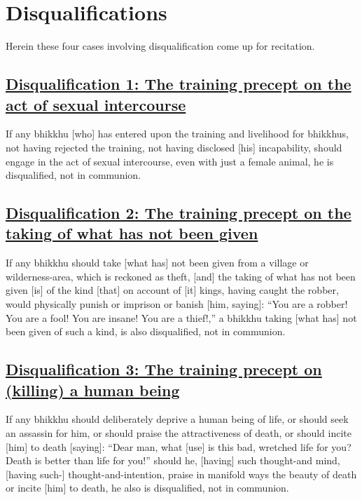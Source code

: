 
\section{Disqualifications}
\label{disqualifications}

\begin{intro}
	Herein these four cases involving disqualification come up for recitation.
\end{intro}

\setsubsecheadstyle{\subsubsectionFmt}
\subsection*{\hyperref[par1]{Disqualification 1: The training precept on the act of sexual intercourse}}
\label{disq1}

If any bhikkhu [who] has entered upon the training and livelihood for bhikkhus, not having rejected the training, not having disclosed [his] incapability, should engage in the act of sexual intercourse, even with just a female animal, he is disqualified, not in communion.



\subsection*{\hyperref[par2]{Disqualification 2: The training precept on the taking of what has not been given}}
\label{disq2}

If any bhikkhu should take [what has] not been given from a village or wilderness-area, which is reckoned as theft, [and] the taking of what has not been given [is] of the kind [that] on account of [it] kings, having caught the robber, would physically punish or imprison or banish [him, saying]: ``You are a robber! You are a fool! You are insane! You are a thief!,'' a bhikkhu taking [what has] not been given of such a kind, is also disqualified, not in communion.



\subsection*{\hyperref[par3]{Disqualification 3: The training precept on (killing) a human being}}
\label{disq3}

If any bhikkhu should deliberately deprive a human being of life, or should seek an assassin for him, or should praise the attractiveness of death, or should incite [him] to death [saying]: ``Dear man, what [use] is this bad, wretched life for you? Death is better than life for you!'' should he, [having] such thought-and mind, [having such-] thought-and-intention, praise in manifold ways the beauty of death or incite [him] to death, he also is disqualified, not in communion.



